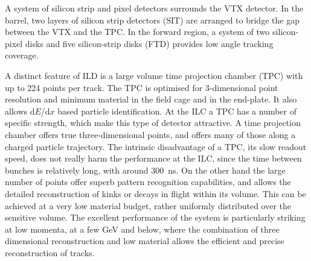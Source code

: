 A system of silicon strip and pixel detectors surrounds the VTX detector. In the barrel, two layers of silicon strip detectors (SIT) are arranged to bridge the gap between the VTX and the TPC. In the forward region, a system of two silicon-pixel disks and five silicon-strip disks (FTD) provides low angle tracking coverage.

A distinct feature of ILD is a large volume time projection chamber (TPC) with up to 224 points per track. The TPC is optimised for 3-dimensional point resolution and minimum material in the field cage and in the end-plate. It also allows d$E$/d$x$ based particle identification. At the ILC a TPC has a number of specific strength, which make this type of detector attractive. A time projection chamber offers true three-dimensional points, and offers many of those along a charged particle trajectory. The intrinsic disadvantage of a TPC, its slow readout speed, does not really harm the performance at the ILC, since the time between bunches is relatively long, with around 300~ns. On the other hand the large number of points offer superb pattern recognition capabilities, and allows the detailed reconstruction of kinks or decays in flight within its volume. This can be achieved at a very low material budget, rather uniformly distributed over the sensitive volume. The excellent performance of the system is particularly striking at low momenta, at a few GeV and below, where the combination of three dimensional reconstruction and low material allows the efficient and precise reconstruction of tracks. 


